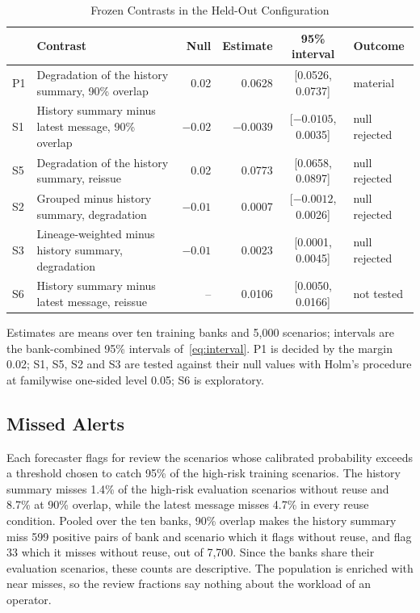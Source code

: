 \documentclass[conference]{IEEEtran}
\newcommand{\tablenote}[1]{\par\smallskip\parbox{\wd\tablebox}{\footnotesize #1}}
\begin{document}
\begin{table}[!t]
  \caption{Frozen Contrasts in the Held-Out Configuration}
  \label{tab:contrasts}
  \centering
  \footnotesize
  \begin{lrbox}{\tablebox}
\begin{tabular}{llrrcl}
\toprule
 & Contrast & Null & Estimate & 95\% interval & Outcome \\
\midrule
P1 & Degradation of the history summary, 90\% overlap & 0.02 & 0.0628 & [0.0526, 0.0737] & material \\
S1 & History summary minus latest message, 90\% overlap & $-0.02$ & $-0.0039$ & [$-0.0105$, 0.0035] & null rejected \\
S5 & Degradation of the history summary, reissue & 0.02 & 0.0773 & [0.0658, 0.0897] & null rejected \\
S2 & Grouped minus history summary, degradation & $-0.01$ & 0.0007 & [$-0.0012$, 0.0026] & null rejected \\
S3 & Lineage-weighted minus history summary, degradation & $-0.01$ & 0.0023 & [0.0001, 0.0045] & null rejected \\
S6 & History summary minus latest message, reissue & -- & 0.0106 & [0.0050, 0.0166] & not tested \\
\bottomrule
\end{tabular}
  \end{lrbox}
  \usebox{\tablebox}
  \tablenote{Estimates are means over ten training banks and 5,000 scenarios; intervals are the bank-combined 95\% intervals of~\eqref{eq:interval}. P1 is decided by the margin 0.02; S1, S5, S2 and S3 are tested against their null values with Holm's procedure at familywise one-sided level 0.05; S6 is exploratory.}
\end{table}

\subsection{Missed Alerts}\label{sec:misses}

Each forecaster flags for review the scenarios whose calibrated probability exceeds a threshold chosen to catch 95\% of the high-risk training scenarios.
The history summary misses 1.4\% of the high-risk evaluation scenarios without reuse and 8.7\% at 90\% overlap, while the latest message misses 4.7\% in every reuse condition.
Pooled over the ten banks, 90\% overlap makes the history summary miss 599 positive pairs of bank and scenario which it flags without reuse, and flag 33 which it misses without reuse, out of 7,700. Since the banks share their evaluation scenarios, these counts are descriptive. The population is enriched with near misses, so the review fractions say nothing about the workload of an operator.
\end{document}

